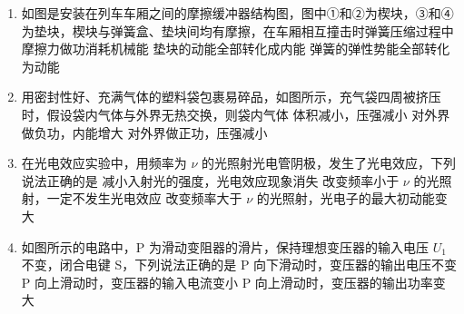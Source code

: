 \documentclass[\gkver]{gaokaozhenti}
\begin{document}
\begin{enumerate}
\item
如图是安装在列车车厢之间的摩擦缓冲器结构图，图中①和②为楔块，③和④为垫块，楔块与弹簧盒、垫块间均有摩擦，在车厢相互撞击时弹簧压缩过程中
{摩擦力做功消耗机械能}
{垫块的动能全部转化成内能}
{弹簧的弹性势能全部转化为动能}

\item
用密封性好、充满气体的塑料袋包裹易碎品，如图所示，充气袋四周被挤压时，假设袋内气体与外界无热交换，则袋内气体
{体积减小，压强减小}
{对外界做负功，内能增大}
{对外界做正功，压强减小}

\item
在光电效应实验中，用频率为 $\nu$ 的光照射光电管阴极，发生了光电效应，下列说法正确的是
{减小入射光的强度，光电效应现象消失}
{改变频率小于 $\nu$ 的光照射，一定不发生光电效应}
{改变频率大于 $\nu$ 的光照射，光电子的最大初动能变大}

\item
如图所示的电路中，P 为滑动变阻器的滑片，保持理想变压器的输入电压 $U_{1}$ 不变，闭合电键 S，下列说法正确的是
{P 向下滑动时，变压器的输出电压不变}
{P 向上滑动时，变压器的输入电流变小}
{P 向上滑动时，变压器的输出功率变大}


\end{enumerate}
\end{document}

